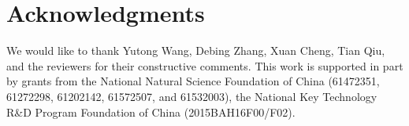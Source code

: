 
\section{Acknowledgments}
We would like to thank Yutong Wang, Debing Zhang, Xuan Cheng, Tian Qiu, and the reviewers for their constructive comments.
This work is supported in part by grants from the National Natural Science Foundation of China (61472351, 61272298, 61202142, 61572507, and 61532003),
the National Key Technology R\&D Program Foundation of China (2015BAH16F00/F02).

%
%
%
